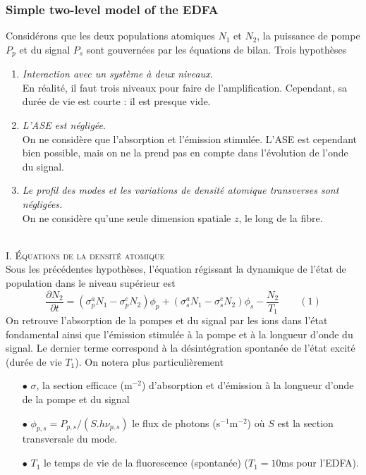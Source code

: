 \subsubsection{Simple two-level model of the EDFA}
Considérons que les deux populations atomiques $N_1$ et $N_2$, la puissance de pompe $P_p$ et du
signal $P_s$ sont gouvernées par les équations de bilan. Trois hypothèses
\begin{enumerate}
\item \textit{Interaction avec un système à deux niveaux}.\\
En réalité, il faut trois niveaux pour faire de l'amplification. Cependant, sa durée de vie est courte
: il est presque vide.
\item \textit{L'ASE est négligée}.\\
On ne considère que l'absorption et l'émission stimulée. L'ASE est cependant bien possible, mais on ne
la prend pas en compte dans l'évolution de l'onde du signal. 
\item \textit{Le profil des modes et les variations de densité atomique transverses sont négligées.}\\
On ne considère qu'une seule dimension spatiale $z$, le long de la fibre. 
\end{enumerate}\ \\

\textsc{I. Équations de la densité atomique}\\
Sous les précédentes hypothèses, l'équation régissant la dynamique de l'état de population dans 
le niveau supérieur est
\begin{equation}
\frac{{\partial {N_2}}}{{\partial t}} = (\sigma _p^a{N_1} - \sigma _p^e{N_2}){\phi _p} + (\sigma _s^a{N_1} - \sigma _s^e{N_2}){\phi _s} - \frac{{{N_2}}}{{{T_1}}}\qquad(1)
\end{equation}
On retrouve l'absorption de la pompes et du signal par les ions dans l'état fondamental ainsi que
l'émission stimulée à la pompe et à la longueur d'onde du signal. Le dernier terme correspond à 
la désintégration spontanée de l'état excité (durée de vie $T_1$). On notera plus particulièrement
\begin{itemize}
\item[$\bullet$] $\sigma$, la section efficace (m$^{-2}$) d'absorption et d'émission à la longueur
d'onde de la pompe et du signal
\item[$\bullet$] ${\phi _{p,s}} = {P_{p,s}}/(S.h{\nu _{p,s}})$ le flux de photons (s$^{-1}$m$^{-2}$)
où $S$ est la section transversale du mode.
\item[$\bullet$] $T_1$ le temps de vie de la fluorescence (spontanée) ($T_1=10$ms pour l'EDFA).
\end{itemize}\ 

